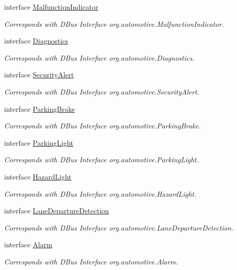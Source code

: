 \begin{DoxyCompactItemize}
interface \hyperlink{interfaceMalfunctionIndicator}{Malfunction\+Indicator}
\begin{DoxyCompactList}\small\item\em Corresponds with D\+Bus Interface org.\+automotive.\+Malfunction\+Indicator. \end{DoxyCompactList}\item 
interface \hyperlink{interfaceDiagnostics}{Diagnostics}
\begin{DoxyCompactList}\small\item\em Corresponds with D\+Bus Interface org.\+automotive.\+Diagnostics. \end{DoxyCompactList}\item 
interface \hyperlink{interfaceSecurityAlert}{Security\+Alert}
\begin{DoxyCompactList}\small\item\em Corresponds with D\+Bus Interface org.\+automotive.\+Security\+Alert. \end{DoxyCompactList}\item 
interface \hyperlink{interfaceParkingBrake}{Parking\+Brake}
\begin{DoxyCompactList}\small\item\em Corresponds with D\+Bus Interface org.\+automotive.\+Parking\+Brake. \end{DoxyCompactList}\item 
interface \hyperlink{interfaceParkingLight}{Parking\+Light}
\begin{DoxyCompactList}\small\item\em Corresponds with D\+Bus Interface org.\+automotive.\+Parking\+Light. \end{DoxyCompactList}\item 
interface \hyperlink{interfaceHazardLight}{Hazard\+Light}
\begin{DoxyCompactList}\small\item\em Corresponds with D\+Bus Interface org.\+automotive.\+Hazard\+Light. \end{DoxyCompactList}\item 
interface \hyperlink{interfaceLaneDepartureDetection}{Lane\+Departure\+Detection}
\begin{DoxyCompactList}\small\item\em Corresponds with D\+Bus Interface org.\+automotive.\+Lane\+Departure\+Detection. \end{DoxyCompactList}\item 
interface \hyperlink{interfaceAlarm}{Alarm}
\begin{DoxyCompactList}\small\item\em Corresponds with D\+Bus Interface org.\+automotive.\+Alarm. \end{DoxyCompactList}\item 

\end{DoxyCompactItemize}
